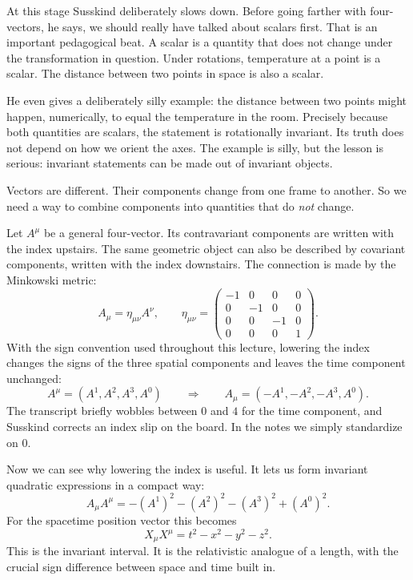 At this stage Susskind deliberately slows down. Before going farther with four-vectors, he says, we should really have talked about scalars first. That is an important pedagogical beat. A scalar is a quantity that does not change under the transformation in question. Under rotations, temperature at a point is a scalar. The distance between two points in space is also a scalar.

He even gives a deliberately silly example: the distance between two points might happen, numerically, to equal the temperature in the room. Precisely because both quantities are scalars, the statement is rotationally invariant. Its truth does not depend on how we orient the axes. The example is silly, but the lesson is serious: invariant statements can be made out of invariant objects.

Vectors are different. Their components change from one frame to another. So we need a way to combine components into quantities that do \emph{not} change.

Let \(A^\mu\) be a general four-vector. Its contravariant components are written with the index upstairs. The same geometric object can also be described by covariant components, written with the index downstairs. The connection is made by the Minkowski metric:
\begin{equation}
A_{\mu}=\eta_{\mu\nu}A^{\nu},
\qquad
\eta_{\mu\nu}=
\begin{pmatrix}
-1&0&0&0\\
0&-1&0&0\\
0&0&-1&0\\
0&0&0&1
\end{pmatrix}.
\end{equation}
With the sign convention used throughout this lecture, lowering the index changes the signs of the three spatial components and leaves the time component unchanged:
\[
A^\mu=(A^1,A^2,A^3,A^0)
\qquad\Longrightarrow\qquad
A_\mu=(-A^1,-A^2,-A^3,A^0).
\]
The transcript briefly wobbles between \(0\) and \(4\) for the time component, and Susskind corrects an index slip on the board. In the notes we simply standardize on \(0\).

Now we can see why lowering the index is useful. It lets us form invariant quadratic expressions in a compact way:
\begin{equation}
A_{\mu}A^{\mu}
=
-\left(A^1\right)^2-\left(A^2\right)^2-\left(A^3\right)^2+\left(A^0\right)^2.
\end{equation}
For the spacetime position vector this becomes
\begin{equation}
X_{\mu}X^{\mu}=t^2-x^2-y^2-z^2.
\end{equation}
This is the invariant interval. It is the relativistic analogue of a length, with the crucial sign difference between space and time built in.

